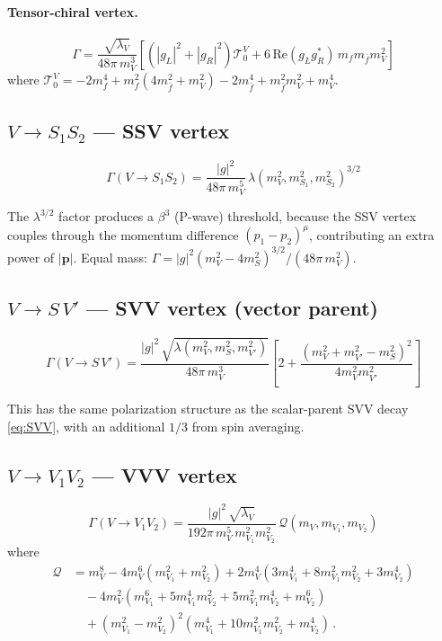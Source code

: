 \documentclass[11pt,a4paper]{article}
\newcommand{\la}{\lambda}
\newcommand{\beq}{\begin{equation}}
\newcommand{\eeq}{\end{equation}}
\newcommand{\conj}[1]{#1^{*}}
\begin{document}
\paragraph{Tensor-chiral vertex.}
\beq
\Gamma = \frac{\sqrt{\la_V}}{48\pi\, m_V^3}
\left[(|g_L|^2+|g_R|^2)\mathcal{T}_0^V
+ 6\,\mathrm{Re}(g_L\conj{g_R})\,m_f m_{\bar f} m_V^2\right]
\label{eq:V-ff-tch}
\eeq
where $\mathcal{T}_0^V = -2m_f^4+m_f^2(4m_{\bar f}^2+m_V^2)-2m_{\bar f}^4+m_{\bar f}^2 m_V^2+m_V^4$.

\subsection{$V \to S_1 S_2$ --- SSV vertex}
\label{sec:SSV}

\beq
\boxed{
\Gamma(V\to S_1 S_2) = \frac{|g|^2}{48\pi\, m_V^5}\,\la(m_V^2, m_{S_1}^2, m_{S_2}^2)^{3/2}
}
\label{eq:SSV}
\eeq

The $\la^{3/2}$ factor produces a $\beta^3$ (P-wave) threshold, because the SSV vertex couples
through the momentum difference $(p_1-p_2)^\mu$, contributing an extra power of $|\mathbf{p}|$.
Equal mass: $\Gamma = |g|^2(m_V^2-4m_{S}^2)^{3/2}/(48\pi\, m_V^2)$.

\subsection{$V \to S\,V'$ --- SVV vertex (vector parent)}
\label{sec:V-SV}

\beq
\boxed{
\Gamma(V\to S\,V') = \frac{|g|^2\,\sqrt{\la(m_V^2,m_S^2,m_{V'}^2)}}{48\pi\, m_V^3}
\left[2 + \frac{(m_V^2+m_{V'}^2-m_S^2)^2}{4m_V^2 m_{V'}^2}\right]
}
\label{eq:V-SV}
\eeq

This has the same polarization structure as the scalar-parent SVV decay \eqref{eq:SVV},
with an additional $1/3$ from spin averaging.

\subsection{$V \to V_1 V_2$ --- VVV vertex}
\label{sec:VVV}

\beq
\boxed{
\Gamma(V\to V_1 V_2) = \frac{|g|^2\,\sqrt{\la_V}}{192\pi\, m_V^5\, m_{V_1}^2 m_{V_2}^2}\,\mathcal{Q}(m_V, m_{V_1}, m_{V_2})
}
\label{eq:VVV}
\eeq
where
\begin{align}
\mathcal{Q} &= m_V^8 - 4m_V^6(m_{V_1}^2+m_{V_2}^2) + 2m_V^4(3m_{V_1}^4+8m_{V_1}^2 m_{V_2}^2+3m_{V_2}^4) \nonumber\\
&\quad - 4m_V^2(m_{V_1}^6+5m_{V_1}^4 m_{V_2}^2+5m_{V_1}^2 m_{V_2}^4+m_{V_2}^6) \nonumber\\
&\quad + (m_{V_1}^2-m_{V_2}^2)^2(m_{V_1}^4+10m_{V_1}^2 m_{V_2}^2+m_{V_2}^4)\,.
\end{align}
\end{document}
